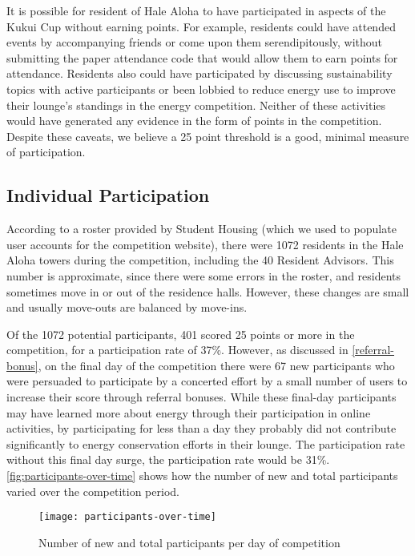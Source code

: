 It is possible for resident of Hale Aloha to have participated in aspects of the Kukui Cup without earning points. For example, residents could have attended events by accompanying friends or come upon them serendipitously, without submitting the paper attendance code that would allow them to earn points for attendance. Residents also could have participated by discussing sustainability topics with active participants or been lobbied to reduce energy use to improve their lounge's standings in the energy competition. Neither of these activities would have generated any evidence in the form of points in the competition. Despite these caveats, we believe a 25 point threshold is a good, minimal measure of participation.


\subsection{Individual Participation}
\label{sec:individual-participation}

According to a roster provided by Student Housing (which we used to populate user accounts for the competition website), there were 1072 residents in the Hale Aloha towers during the competition, including the 40 Resident Advisors. This number is approximate, since there were some errors in the roster, and residents sometimes move in or out of the residence halls. However, these changes are small and usually move-outs are balanced by move-ins.

Of the 1072 potential participants, 401 scored 25 points or more in the competition, for a participation rate of 37\%. However, as discussed in \autoref{referral-bonus}, on the final day of the competition there were 67 new participants who were persuaded to participate by a concerted effort by a small number of users to increase their score through referral bonuses. While these final-day participants may have learned more about energy through their participation in online activities, by participating for less than a day they probably did not contribute significantly to energy conservation efforts in their lounge. The participation rate without this final day surge, the participation rate would be 31\%. \autoref{fig:participants-over-time} shows how the number of new and total participants varied over the competition period.

\begin{figure}[htbp]
	\centering
		\texttt{[image: participants-over-time]}
		\caption{Number of new and total participants per day of competition}
\label{fig:participants-over-time}
\end{figure}


